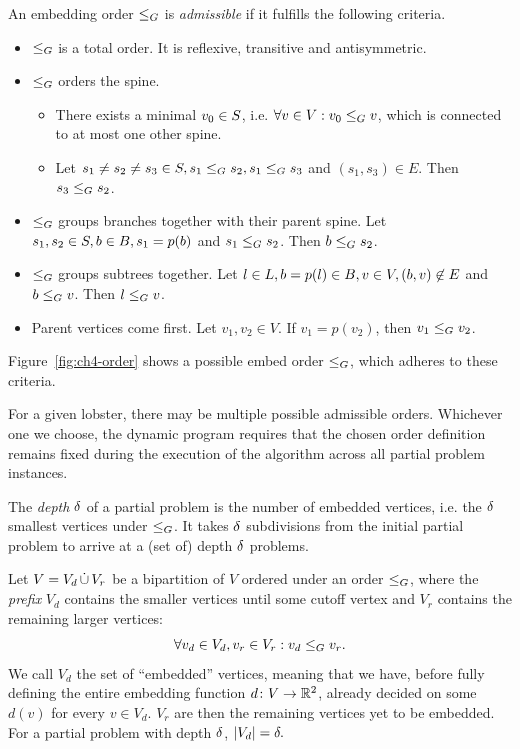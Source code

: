 An embedding order $\leq_G$ is \emph{admissible} if it fulfills the following criteria.

\begin{itemize}
    \item $\leq_G$ is a total order. It is reflexive, transitive and antisymmetric.
    \item $\leq_G$ orders the spine.
    \begin{itemize}
        \item There exists a minimal $v_0 \in S$, i.e. $\forall v \in V: v_0 \leq_G v$, which is connected to at most one other spine.
        \item Let $s_1 \neq s_2 \neq s_3 \in S, s_1 \leq_G s_2, s_1 \leq_G s_3$ and $(s_1, s_3) \in E$. Then $s_3 \leq_G s_2$.
    \end{itemize}
    \item $\leq_G$ groups branches together with their parent spine. Let $s_1, s_2 \in S, b \in B, s_1 = p(b)$ and $s_1 \leq_G s_2$. Then $b \leq_G s_2$.
    \item $\leq_G$ groups subtrees together. Let $l \in L, b = p(l) \in B, v \in V, (b, v) \not\in E$ and $b \leq_G v$. Then $l \leq_G v$.
    \item Parent vertices come first. Let $v_1, v_2 \in V$. If $v_1 = p(v_2)$, then $v_1 \leq_G v_2$.
\end{itemize}

Figure~\ref{fig:ch4-order} shows a possible embed order $\leq_G$, which adheres to these criteria.

For a given lobster, there may be multiple possible admissible orders. Whichever one we choose, the dynamic program requires that the chosen order definition remains fixed during the execution of the algorithm across all partial problem instances.

The \emph{depth} $\delta$ of a partial problem is the number of embedded vertices, i.e. the $\delta$ smallest vertices under $\leq_G$. It takes $\delta$ subdivisions from the initial partial problem to arrive at a (set of) depth $\delta$ problems.

Let $V = V_d \,\dot{\cup}\, V_r$ be a bipartition of $V$ ordered under an order $\leq_G$, where the \emph{prefix} $V_d$ contains the smaller vertices until some cutoff vertex and $V_r$ contains the remaining larger vertices: $$\forall v_d \in V_d, v_r \in V_r: v_d \leq_G v_r.$$ We call $V_d$ the set of ``embedded'' vertices, meaning that we have, before fully defining the entire embedding function $d\colon V \to \mathbb R^2$, already decided on some $d(v)$ for every $v \in V_d$. $V_r$ are then the remaining vertices yet to be embedded. For a partial problem with depth $\delta$, $|V_d| = \delta.$

